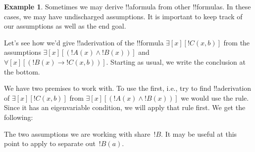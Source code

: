 \documentclass[10pt,a4paper]{article}
\theoremstyle{plain}
\theoremstyle{definition}
\newtheorem{ex}[thm]{Example}
\theoremstyle{remark}
\providecommand{\AxiomC}[1]{}
\providecommand{\UnaryInfC}[1]{}
\providecommand{\BinaryInfC}[1]{}
\providecommand{\RightLabel}[1]{}
\newenvironment{prooftree}{}{}
\providecommand{\lif}{\mathbin{\rightarrow}}
\providecommand{\lforall}{\mathord{\forall}}
\providecommand{\lexists}{\mathord{\exists}}
\providecommand{\Elim}[1]{}
\providecommand{\Discharge}{\mathrm{Dis}}
\providecommand{\DischargeRule}{\mathrm{Dis}}
\providecommand{\DischargeRule}{\mathrm{Dis}}
\begin{document}
\begin{ex}
Sometimes we may derive !!a{formula} from other !!{formula}s.
In these cases, we may have undischarged assumptions. It is 
important to keep track of our assumptions as well
as the end goal.

Let's see how we'd give !!a{derivation} of the !!{formula}
$\lexists[x][!C(x,b)]$ from the assumptions $\lexists[x][(!A(x) 
\land !B(x))]$ and $\lforall[x][(!B(x) \lif !C(x,b))]$.
Starting as usual, we write the conclusion at the
bottom.
\begin{prooftree}
\AxiomC{}
\UnaryInfC{$\lexists[x][!C(x,b)]$}
\end{prooftree}

We have two premises to work with. To use the first, i.e., try to find
!!a{derivation} of $\lexists[x][!C(x, b)]$ from $\lexists[x][(!A(x)
  \land !B(x))]$ we would use the \Elim{\lexists} rule. Since it has
an eigenvariable condition, we will apply that rule first. We get the
following:
\begin{prooftree}
\AxiomC{$\lexists[x][(!A(x) \land !B(x))]$}
\AxiomC{$\Discharge{!A(a) \land !B(a)}{1}$}
\DeduceC{$\lexists[x][!C(x,b)]$}
\DischargeRule{\Elim{\lexists}}{1}
\BinaryInfC{$\lexists[x][!C(x,b)]$}
\end{prooftree}
The two assumptions we are working with share~$!B$.  It may be useful
at this point to apply \Elim{\land} to separate out~$!B(a)$.
\begin{prooftree}
\AxiomC{$\lexists[x][(!A(x) \land !B(x)])$}
\AxiomC{$\Discharge{!A(a) 
\land !B(a)}{1}$}
\RightLabel{\Elim{\land}}
\UnaryInfC{$!B(a)$}
\DeduceC{$\lexists[x][!C(x,b)]$}
\DischargeRule{\Elim{\lexists}}{1}
\BinaryInfC{$\lexists[x][!C(x,b)]$}
\end{prooftree}


\end{ex}
\end{document}
